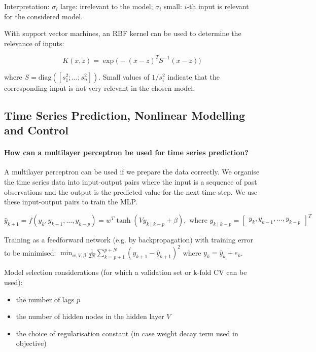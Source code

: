 Interpretation: $\sigma_i$ large: irrelevant to the model; $\sigma_i$ small: $i$-th input is relevant for the considered model.

With support vector machines, an RBF kernel can be used to determine the relevance of inputs:

$$
K(x, z) = \exp{\big( - (x - z)^T S^{-1} (x - z) \big)}
$$

where $S = \text{diag}([s_1^2; \dots; s_n^2])$.
Small values of $1 / s_i^2$ indicate that the corresponding input is not very relevant in the chosen model.


\newpage
\subsection{Time Series Prediction, Nonlinear Modelling and Control}

\paragraph{How can a multilayer perceptron be used for time series prediction?}

A multilayer perceptron can be used if we prepare the data correctly. We organise the time series
data into input-output pairs where the input is a sequence of past observations and the output is the
predicted value for the next time step. We use these input-output pairs to train the MLP.

\vspace{-10pt}

$$
\hat{y}_{k+1} = f(y_k, y_{k-1}, \dots, y_{k-p})
= w^T \tanh(V y_{k \mid k-p} + \beta), \text{ where }
y_{k \mid k-p} = \begin{bmatrix}
    y_k, y_{k-1}, \dots, y_{k-p}
\end{bmatrix}^T
$$

\vspace{10pt}

Training as a feedforward network (e.g. by backpropagation)
with training error to be minimised:
$\min_{w, V, \beta}{\frac{1}{2N} \sum_{k=p+1}^{p+N}{(y_{k+1} - \hat{y}_{k+1})^2}}$
where $y_k = \hat{y}_k + e_k$.

Model selection considerations (for which a validation set or k-fold CV can be used):

\begin{itemize}
    \item the number of lags $p$
    \item the number of hidden nodes in the hidden layer $V$
    \item the choice of regularisation constant (in case weight decay term used in objective)
\end{itemize}

